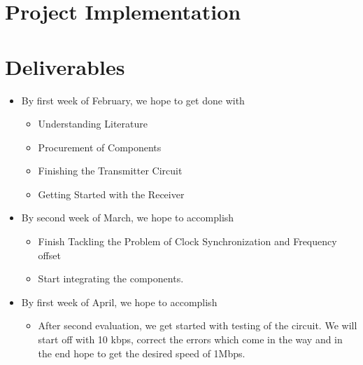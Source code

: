 \documentclass{article}
\begin{document}
\section{Project Implementation}

\section{Deliverables}
\begin{itemize}
\item By first week of February, we hope to get done with
  \begin{itemize}
  \item Understanding Literature
  \item Procurement of Components
  \item Finishing the Transmitter Circuit
  \item Getting Started with the Receiver 
  \end{itemize}

\item By second week of March, we hope to accomplish

  \begin{itemize}
  \item Finish Tackling the Problem of Clock Synchronization and Frequency offset
  \item Start integrating the components.
  \end{itemize}

\item By first week of April, we hope to accomplish
  \begin{itemize}
  \item After second evaluation, we get started with testing of the circuit. We will start off with 10 kbps, correct the errors which come in the way and in the end   hope to get the desired speed of 1Mbps. 
  \end{itemize}
\end{itemize}
\end{document}
